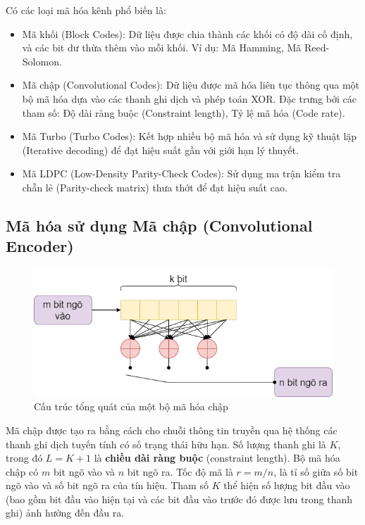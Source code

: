 Có các loại mã hóa kênh phổ biến là:
\begin{itemize}[label = -]
	\item Mã khối (Block Codes): Dữ liệu được chia thành các khối có độ dài cố định, và các bit dư thừa thêm vào mỗi khối. Ví dụ: Mã Hamming, Mã Reed-Solomon.
	\item Mã chập (Convolutional Codes): Dữ liệu được mã hóa liên tục thông qua một bộ mã hóa dựa vào các thanh ghi dịch và phép toán XOR. Đặc trưng bởi các tham số: Độ dài ràng buộc (Constraint length), Tỷ lệ mã hóa (Code rate).
	\item Mã Turbo (Turbo Codes): Kết hợp nhiều bộ mã hóa và sử dụng kỹ thuật lặp (Iterative decoding) để đạt hiệu suất gần với giới hạn lý thuyết.
	\item Mã LDPC (Low-Density Parity-Check Codes): Sử dụng ma trận kiểm tra chẵn lẻ (Parity-check matrix) thưa thớt để đạt hiệu suất cao.
\end{itemize}

\subsection{Mã hóa sử dụng Mã chập (Convolutional Encoder)}

\begin{figure}[H]
	\centering
	\includegraphics[width=.7\linewidth]{sections/pic/cosolythuyet/structure_convolutional_code.png}
	\caption{Cấu trúc tổng quát của một bộ mã hóa chập}
	\label{f_structure-convolutional-code}
\end{figure}

Mã chập được tạo ra bằng cách cho chuỗi thông tin truyền qua hệ thống các thanh ghi dịch tuyến tính có số trạng thái hữu hạn. Số lượng thanh ghi là \( K \), trong đó \( L = K + 1\) là \textbf{chiều dài ràng buộc} (constraint length). Bộ mã hóa chập có \( m \) bit ngõ vào và \( n \) bit ngõ ra. Tốc độ mã là \( r = m/n \), là tỉ số giữa số bit ngõ vào và số bit ngõ ra của tín hiệu. Tham số \( K \) thể hiện số lượng bit đầu vào (bao gồm bit đầu vào hiện tại và các bit đầu vào trước đó được lưu trong thanh ghi) ảnh hưởng đến đầu ra.

